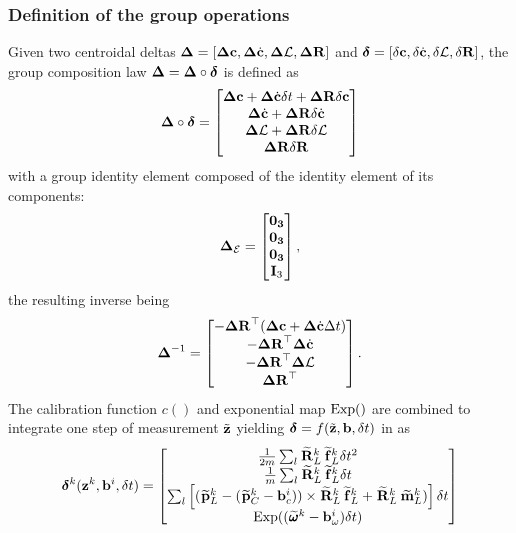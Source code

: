 \subsubsection{Definition of the group operations}

Given two centroidal deltas ${{\bm \Delta}}=[{{\bm \Delta}}{\bf c},{{\bm \Delta}}\dot{{\bf c}},{{\bm \Delta}}\mathcal{L}, {\bm \Delta {\bf R}}]$ and ${\bm \delta}=[\delta{\bf c},\delta\dot{{\bf c}},\delta\mathcal{L}, {\delta{\bf R}}]$, 
the group composition law ${{\bm \Delta}}={{\bm \Delta}}\circ\bm\delta$ is defined as
%
\begin{equation} 
    \D \circ \bm\delta
    =
    \begin{bmatrix}
        \D\COM + \D\COMd\dt + \DR\delta\COM \\
        \D\COMd + \DR\delta\COMd \\
        \D\AM + \DR\delta\AM \\
        \DR\dR 
    \end{bmatrix}
    \label{eq:composition_delta_com}
\end{equation}
%
with a group identity element composed of the identity element of its components:
%
\begin{equation}
    {{\bm \Delta}}_{\mathcal{E}} = \begin{bmatrix}
    \bf0_3\\ \bf0_3 \\ \bf0_3 \\ {\bf I}_3
    \end{bmatrix},
\end{equation}
%
the resulting inverse being
%
\begin{equation}
    \D^{-1} =     
    \begin{bmatrix}
    - \DR\tr(\D\COM + \D\COMd \Dt) \\
    - \DR\tr \D\COMd \\
    - \DR\tr \D\AM \\
      \DR\tr
    \end{bmatrix}.
\label{eq:inverse_delta_com}
\end{equation}
%
The calibration function $c()$ and exponential map $\operatorname*{Exp}()$ are combined to integrate one step of measurement $\tilde{{\bf z}}$
yielding $\bm\delta=f(\tilde{{\bf z}},{\bf b},\delta t)$ in  as
%
\begin{equation}
    \bm\delta^{k}(\bfz^k, \bfb^i, \dt) =
    \begin{bmatrix}
    \frac{1}{2m} \sum_l \Rotm{}{L}^k \forcem{}{L}^k \dt^2
    \\
    \frac{1}{m} \sum_l \Rotm{}{L}^k \forcem{}{L}^k \dt 
    \\
    \sum_l\left[ (\posim{}{L}^k - (\posim{}{C}^k - \bias_c^i)) \times \Rotm{}{L}^k \forcem{}{L}^k + \Rotm{}{L}^k\torquem{}{L}^k) \right] \dt
    \\
    \Exp((\angvelm{}{}^k - \bias_{\omega}^i)\dt)
    \end{bmatrix}
    \label{eq:data2delta_com}
\end{equation}
%






